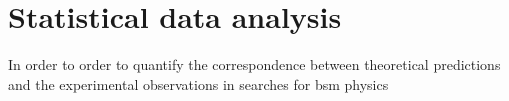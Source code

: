 

\chapter{Statistical data analysis}\label{ch:statistics}

\ifpdf
    \graphicspath{{chapter-statistics/Figs/Raster/}{chapter-statistics/Figs/PDF/}{chapter-statistics/Figs/}}
\else
    \graphicspath{{chapter-statistics/Figs/Vector/}{chapter-statistics/Figs/}}
\fi


In order to order to quantify the correspondence between theoretical predictions and the experimental observations in searches for \gls{bsm} physics 